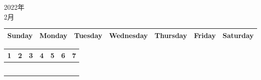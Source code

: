 \documentclass[a4paper,landscape]{jsarticle}
\newcommand{\dig}{\hspace{29mm}}
\newcommand{\LBF}{\LARGE\textbf}
\begin{document}
\newpage

\begin{center}
	\LARGE 2022年\\ %
	\LARGE 2月%
\end{center}


\begingroup
\renewcommand{\arraystretch}{1.4}
\begin{tabular}{|>{\centering\arraybackslash}p{32mm}|>{\centering\arraybackslash}p{32mm}|>{\centering\arraybackslash}p{32mm}|>{\centering\arraybackslash}p{32mm}|>{\centering\arraybackslash}p{32mm}|>{\centering\arraybackslash}p{32mm}|>{\centering\arraybackslash}p{32mm}|}
\hline
\large Sunday&\large Monday &\large Tuesday&\large Wednesday&\large Thursday&\large Friday&\large Saturday\\ 
\hline
\end{tabular}
\endgroup

\begingroup
\renewcommand{\arraystretch}{4}
\begin{tabular}{|p{32mm}|p{32mm}|p{32mm}|p{32mm}|p{32mm}|p{32mm}|p{32mm}|}
\hline
\raisebox{40pt} {\dig\LBF1}&\raisebox{45pt} {\dig\LBF2}&\raisebox{45pt} {\dig\LBF3}&\raisebox{45pt} {\dig\LBF4}&\raisebox{45pt} {\dig\LBF5}&\raisebox{45pt} {\dig\LBF6}&\raisebox{45pt} {\dig\LBF7}\\  
\hline
&&&&&&\\ 
\hline
&&&&&&\\ 
\hline
&&&&&&\\ 
\hline
&&&&&&\\ 
\hline
&&&&&&\\ 
\hline
\end{tabular}
\endgroup
\end{document}
